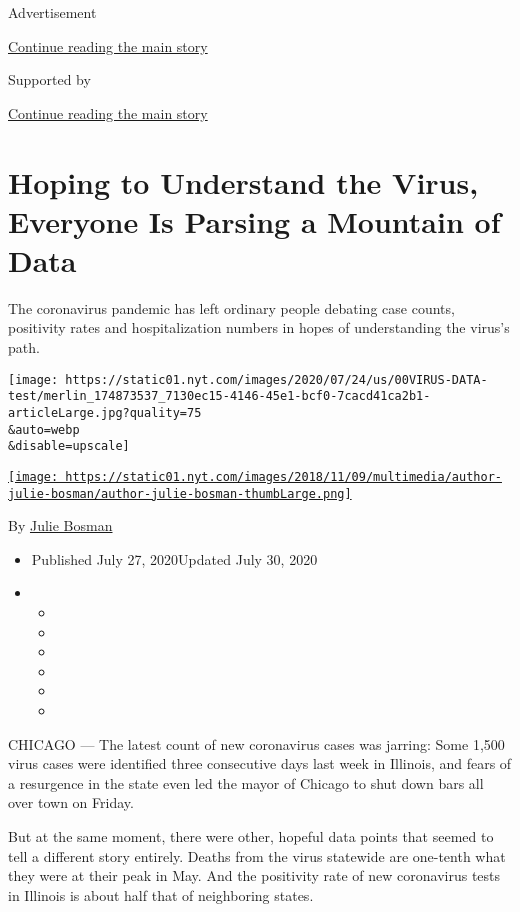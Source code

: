 Advertisement

\protect\hyperlink{after-top}{Continue reading the main story}

Supported by

\protect\hyperlink{after-sponsor}{Continue reading the main story}

\hypertarget{hoping-to-understand-the-virus-everyone-is-parsing-a-mountain-of-data}{%
\section{Hoping to Understand the Virus, Everyone Is Parsing a Mountain
of
Data}\label{hoping-to-understand-the-virus-everyone-is-parsing-a-mountain-of-data}}

The coronavirus pandemic has left ordinary people debating case counts,
positivity rates and hospitalization numbers in hopes of understanding
the virus's path.

\texttt{[image: https://static01.nyt.com/images/2020/07/24/us/00VIRUS-DATA-test/merlin\_174873537\_7130ec15-4146-45e1-bcf0-7cacd41ca2b1-articleLarge.jpg?quality=75\\\&auto=webp\\\&disable=upscale]}

\href{https://www.nytimes.com/by/julie-bosman}{\texttt{[image: https://static01.nyt.com/images/2018/11/09/multimedia/author-julie-bosman/author-julie-bosman-thumbLarge.png]}}

By \href{https://www.nytimes.com/by/julie-bosman}{Julie Bosman}

\begin{itemize}
\item
  Published July 27, 2020Updated July 30, 2020
\item
  \begin{itemize}
  \item
  \item
  \item
  \item
  \item
  \item
  \end{itemize}
\end{itemize}

CHICAGO --- The latest count of new coronavirus cases was jarring: Some
1,500 virus cases were identified three consecutive days last week in
Illinois, and fears of a resurgence in the state even led the mayor of
Chicago to shut down bars all over town on Friday.

But at the same moment, there were other, hopeful data points that
seemed to tell a different story entirely. Deaths from the virus
statewide are one-tenth what they were at their peak in May. And the
positivity rate of new coronavirus tests in Illinois is about half that
of neighboring states.

